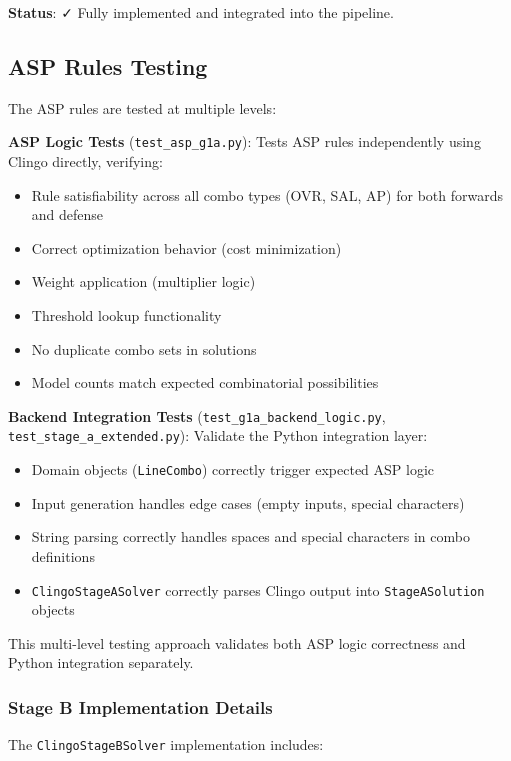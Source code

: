 \textbf{Status}: ✓ Fully implemented and integrated into the pipeline.

\subsection{ASP Rules Testing}

The ASP rules are tested at multiple levels:

\textbf{ASP Logic Tests} (\texttt{test\_asp\_g1a.py}): Tests ASP rules independently using Clingo directly, verifying:
\begin{itemize}
    \item Rule satisfiability across all combo types (OVR, SAL, AP) for both forwards and defense
    \item Correct optimization behavior (cost minimization)
    \item Weight application (multiplier logic)
    \item Threshold lookup functionality
    \item No duplicate combo sets in solutions
    \item Model counts match expected combinatorial possibilities
\end{itemize}

\textbf{Backend Integration Tests} (\texttt{test\_g1a\_backend\_logic.py}, \texttt{test\_stage\_a\_extended.py}): Validate the Python integration layer:
\begin{itemize}
    \item Domain objects (\texttt{LineCombo}) correctly trigger expected ASP logic
    \item Input generation handles edge cases (empty inputs, special characters)
    \item String parsing correctly handles spaces and special characters in combo definitions
    \item \texttt{ClingoStageASolver} correctly parses Clingo output into \texttt{StageASolution} objects
\end{itemize}

This multi-level testing approach validates both ASP logic correctness and Python integration separately.

\subsubsection{Stage B Implementation Details}

The \texttt{ClingoStageBSolver} implementation includes:


